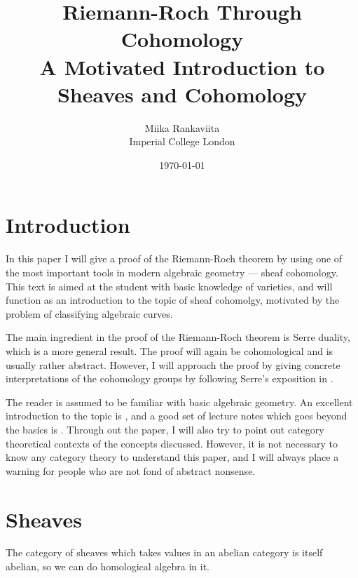 \documentclass[12pt]{article}
\begin{document}
\title{Riemann-Roch Through Cohomology\\
        \large A Motivated Introduction to Sheaves and Cohomology}
\author{Miika Rankaviita\\Imperial College London}
\date{\today}
\maketitle

\theoremstyle{plain}
\newtheorem{thm}{Theorem}[section]
\newtheorem{cor}{Corollary}[thm]
\newtheorem{prop}[thm]{Proposition}
\newtheorem{lemm}[thm]{Lemma}
\newtheorem*{rem}{Remark}
\theoremstyle{definition}
\newtheorem{defin}[thm]{Definition}
\newtheorem{ex}[thm]{Example}


\section{Introduction}
In this paper I will give a proof of the Riemann-Roch theorem
by using one of the most important tools in modern algebraic geometry ---
sheaf cohomology. This text is aimed at the student with
basic knowledge of varieties, and will function as an introduction
to the topic of sheaf cohomolgy, motivated by the problem of classifying
algebraic curves.


The main ingredient in the proof of the Riemann-Roch theorem is
Serre duality, which is a more general result. The proof will again
be cohomological and is usually rather abstract. However, I will
approach the proof by giving concrete interpretations of
the cohomology groups by following Serre's exposition in \cite{serre}.

The reader is assumed to be familiar with basic algebraic geometry.
An excellent introduction to the topic is \cite{reid}, and a good set
of lecture notes which goes beyond the basics is \cite{gathmann}.
Through out the paper, I will also try to point out category theoretical
contexts of the concepts discussed. However, it is not necessary to know
any category theory to understand this paper, and I will always place a
warning for people who are not fond of abstract nonsense.

\section{Sheaves}
The category of sheaves which takes values in an abelian category is
itself abelian, so we can do homological algebra in it.
\end{document}
